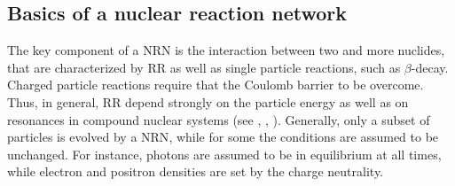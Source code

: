 %


\subsection{Basics of a nuclear reaction network}

The key component of a \ac{NRN} is the interaction between two and more nuclides, 
that are characterized by \ac{RR} as well as single particle reactions, such as $\beta$-decay.
Charged particle reactions require that the Coulomb barrier to be overcome. 
Thus, in general, \ac{RR} depend strongly on the particle energy as well as on 
resonances in compound nuclear systems (see \eg, \citet{Clayton:1968}, ). 
%
%
%
%
Generally, only a subset of particles is evolved by a \ac{NRN}, while for some the conditions 
are assumed to be unchanged. For instance, photons are assumed to be in equilibrium at all 
times, while electron and positron densities are set by the charge neutrality. 

